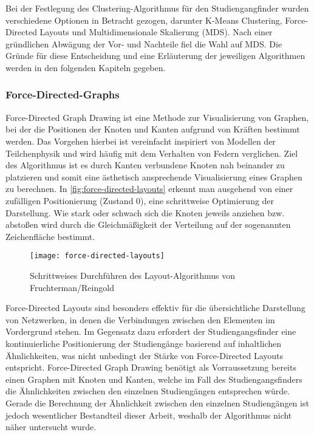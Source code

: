 Bei der Festlegung des Clustering-Algorithmus für den Studiengangfinder wurden
verschiedene Optionen in Betracht gezogen, darunter K-Means Clustering,
Force-Directed Layouts und Multidimensionale Skalierung (MDS). Nach einer
gründlichen Abwägung der Vor- und Nachteile fiel die Wahl auf MDS. Die Gründe
für diese Entscheidung und eine Erläuterung der jeweiligen Algorithmen werden in
den folgenden Kapiteln gegeben.

\subsubsection{Force-Directed-Graphs}
Force-Directed Graph Drawing ist eine Methode zur Visualisierung von Graphen,
bei der die Positionen der Knoten und Kanten aufgrund von Kräften bestimmt
werden. Das Vorgehen hierbei ist vereinfacht inspiriert von Modellen der
Teilchenphysik und wird häufig mit dem Verhalten von Federn verglichen. Ziel des
Algorithmus ist es durch Kanten verbundene Knoten nah beinander zu platzieren
und somit eine ästhetisch ansprechende Visualisierung eines Graphen zu
berechnen. In \autoref{fig:force-directed-layouts} erkennt man ausgehend von
einer zufälligen Positionierung (Zustand 0), eine schrittweise Optimierung der
Darstellung. Wie stark oder schwach sich die Knoten jeweils
\glqq anziehen\grqq{} bzw. \glqq abstoßen\grqq{} wird durch die Gleichmäßigkeit
der Verteilung auf der sogenannten Zeichenfläche bestimmt.
\parencite{force-directed-layouts}

\begin{figure}[H]
    \centering
    \texttt{[image: force-directed-layouts]}
    \caption{Schrittweises Durchführen des Layout-Algorithmus von Fruchterman/Reingold}
    \label{fig:force-directed-layouts}
\end{figure}

Force-Directed Layouts sind besonders effektiv für die übersichtliche
Darstellung von Netzwerken, in denen die Verbindungen zwischen den Elementen im
Vordergrund stehen. \parencite{force-directed-layouts} Im Gegensatz dazu
erfordert der Studiengangsfinder eine kontinuierliche Positionierung der
Studiengänge basierend auf inhaltlichen Ähnlichkeiten, was nicht unbedingt der
Stärke von Force-Directed Layouts entspricht. Force-Directed Graph Drawing
benötigt als Vorraussetzung bereits einen Graphen mit Knoten und Kanten, welche
im Fall des Studiengangsfinders die Ähnlichkeiten zwischen den einzelnen
Studiengängen entsprechen würde. Gerade die Berechnung der Ähnlichkeit zwischen
den einzelnen Studiengängen ist jedoch wesentlicher Bestandteil dieser Arbeit,
weshalb der Algorithmus nicht näher untersucht wurde.

